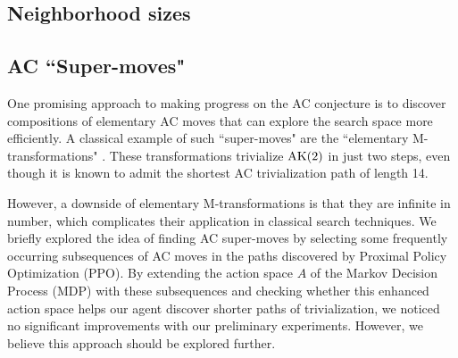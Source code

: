 \subsection{Neighborhood sizes}


\subsection{AC ``Super-moves"}

One promising approach to making progress on the AC conjecture is to discover compositions of elementary AC moves that can explore the search space more efficiently. A classical example of such ``super-moves" are the ``elementary M-transformations" \cite{BurnsI, BurnsII}. These transformations trivialize $\text{AK}(2)$ in just two steps, even though it is known to admit the shortest AC trivialization path of length 14.

However, a downside of elementary M-transformations is that they are infinite in number, which complicates their application in classical search techniques. We briefly explored the idea of finding AC super-moves by selecting some frequently occurring subsequences of AC moves in the paths discovered by Proximal Policy Optimization (PPO). By extending the action space $A$ of the Markov Decision Process (MDP) with these subsequences and checking whether this enhanced action space helps our agent discover shorter paths of trivialization, we noticed no significant improvements with our preliminary experiments. However, we believe this approach should be explored further.